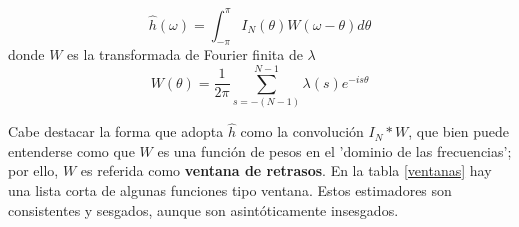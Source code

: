 \documentclass[12pt,a4paper]{mitthesis}
\newcommand{\intPI}{\int_{-\pi}^{\pi}}
\newcommand{\est}[1]{\widehat{ #1 }}
\begin{document}
\begin{equation*}
\est{h}(\omega) = \intPI I_N(\theta) W(\omega-\theta) d\theta
\end{equation*}
donde $W$ es la transformada de Fourier finita de $\lambda$
\begin{equation*}
W(\theta) = \frac{1}{2\pi} \sum_{s = -(N-1)}^{N-1} \lambda(s) e^{-is\theta}
\end{equation*}

Cabe destacar la forma que adopta $\est{h}$ como la convoluci\'on $I_N \ast W$, que bien puede 
entenderse como que $W$ es una funci\'on de pesos en el 'dominio de las frecuencias'; por ello, $W$ 
es referida como \textbf{ventana de retrasos}.
En la tabla \ref{ventanas} hay una lista corta de algunas funciones tipo ventana. Estos estimadores 
son consistentes y sesgados, aunque son asint\'oticamente insesgados.
\end{document}
